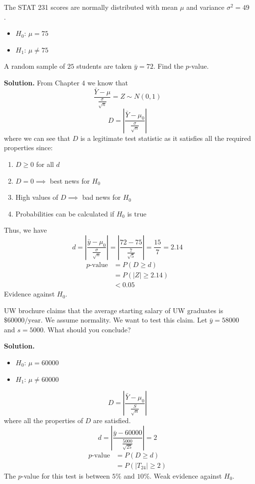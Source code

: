 \begin{Example}{}{}
    The STAT 231 scores are normally distributed with mean $ \mu $
    and variance $ \sigma^2=49 $.
    \begin{itemize}
        \item $ H_0 $: $ \mu=75 $
        \item $ H_1 $: $ \mu\neq 75 $
    \end{itemize}
    A random sample of $ 25 $ students are taken $ \bar{y}=72 $.
    Find the $ p $-value.

    \textbf{Solution.}
    From Chapter $ 4 $ we know that
    \[ \frac{\bar{Y}-\mu}{\frac{\sigma}{\sqrt{n}}} =Z \sim N(0,1) \]
    \[ D=\left|\frac{\bar{Y}-\mu_0}{\frac{\sigma}{\sqrt{n}}}\right| \]
    where we can see that $ D $ is a legitimate test statistic as
    it satisfies all the required properties since:
    \begin{enumerate}
        \item $ D\geqslant 0 $ for all $ d $
        \item $ D=0\implies $ best news for $ H_0 $
        \item High values of $ D \implies $ bad news for $ H_0 $
        \item Probabilities can be calculated if $ H_0 $ is true
    \end{enumerate}
    Thus, we have
    \[ d=\left|\frac{\bar{y}-\mu_0}{\frac{\sigma}{\sqrt{n}}}\right|=
        \left|\frac{72-75}{\frac{7}{\sqrt{5}}} \right|=\frac{15}{7} =2.14 \]
    \begin{align*}
        p\text{-value}
         & =P(D\geqslant d)      \\
         & =P(|Z|\geqslant 2.14) \\
         & <0.05
    \end{align*}
    Evidence against $ H_0 $.
\end{Example}



\begin{Example}{}{}
    UW brochure claims that the average starting salary of UW graduates
    is $ \$60000\text{/year} $. We assume normality. We want to test this claim.
    Let $ \bar{y}=58000 $ and $ s=5000 $. What should you conclude?

    \textbf{Solution.}
    \begin{itemize}
        \item $ H_0 $: $ \mu=60000 $
        \item $ H_1 $: $ \mu\neq 60000 $
    \end{itemize}
    \[ D=\left|\frac{\bar{Y}-\mu_0}{\frac{S}{\sqrt{n}}}\right| \]
    where all the properties of $ D $ are satisfied.
    \[ d=\left|\frac{\bar{y}-60000}{\frac{5000}{\sqrt{25}}}\right|=2 \]
    \begin{align*}
        p\text{-value}
         & =P(D\geqslant d)        \\
         & =P(|T_{24}|\geqslant 2)
    \end{align*}
    The $ p $-value for this test is between $ 5\% $ and $ 10\% $. Weak evidence
    against $ H_0 $.
\end{Example}

